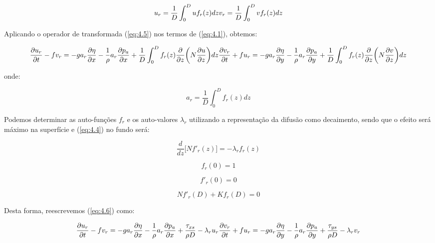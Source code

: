 \documentclass[11pt]{article}
\begin{document}
\begin{equation}
    u_r = \frac{1}{D}\int^{D}_{0}u f_r(z) dz
    \\
    v_r = \frac{1}{D}\int^{D}_{0}v f_r(z) dz
    \label{eq:4.5}
\end{equation}

Aplicando o operador de transformada (\ref{eq:4.5}) nos termos de
(\ref{eq:4.1}), obtemos:

\begin{equation}
    \frac{\partial{u_r}}{\partial{t}} - fv_r = -ga_r\frac{\partial{\eta}}{\partial{x}} - \frac{1}{\rho}a_r\frac{\partial{p_a}}{\partial{x}} + \frac{1}{D}\int^{D}_{0}f_r(z)\frac{\partial}{\partial{z}}\bigg( N\frac{\partial{u}}{\partial{z}} \bigg)dz
    \\
    \frac{\partial{v_r}}{\partial{t}} + fu_r = -ga_r\frac{\partial{\eta}}{\partial{y}} - \frac{1}{\rho}a_r\frac{\partial{p_a}}{\partial{y}} + \frac{1}{D}\int^{D}_{0}f_r(z)\frac{\partial}{\partial{z}}\bigg( N\frac{\partial{v}}{\partial{z}} \bigg)dz
    \label{eq:4.6}
\end{equation}

onde:

\begin{equation}
    a_r = \frac{1}{D}\int^{D}_{0}f_r(z)dz
    \label{eq:4.7}
\end{equation}

Podemos determinar as auto-funções \(f_r\) e os auto-valores
\(\lambda_r\) utilizando a representação da difusão como decaimento,
sendo que o efeito será máximo na superfície e (\ref{eq:4.4}) no fundo
será:

\begin{equation}
    \frac{d}{dz}\bigg[ Nf'_r(z) \bigg] = -\lambda_r f_r(z)
\end{equation}

\begin{equation}
    f_r(0) = 1
    \label{eq:4.8}
\end{equation}

\begin{equation}
    f'_r(0) = 0
    \label{eq:4.9}
\end{equation}

\begin{equation}
    N f'_r(D) + K f_r(D) = 0
    \label{eq:4.10}
\end{equation}

Desta forma, reescrevemos (\ref{eq:4.6}) como:

\begin{equation}
    \frac{\partial{u_r}}{\partial{t}} - fv_r = -ga_r\frac{\partial{\eta}}{\partial{x}} - \frac{1}{\rho}a_r\frac{\partial{p_a}}{\partial{x}} + \frac{\tau_{xs}}{\rho D} - \lambda_ru_r
    \\
    \frac{\partial{v_r}}{\partial{t}} + fu_r = -ga_r\frac{\partial{\eta}}{\partial{y}} - \frac{1}{\rho}a_r\frac{\partial{p_a}}{\partial{y}} + \frac{\tau_{ys}}{\rho D} - \lambda_rv_r
    \label{eq:4.11}
\end{equation}
\end{document}
